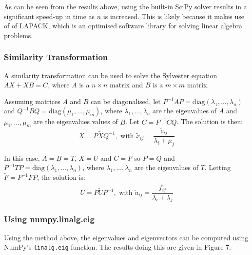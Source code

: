 \documentclass{article}
\numberwithin{equation}{section}
\begin{document}
As can be seen from the results above, using the built-in SciPy solver results in a significant speed-up in time as $n$ is increased. This is likely because it makes use of of LAPACK, which is an optimised software library for solving linear algebra problems.


\subsubsection{Similarity Transformation}
A similarity transformation \cite{Simoncini} can be used to solve the Sylvester equation $AX + XB = C$, where $A$ is a $n \times n$ matrix and $B$ is a $m \times m$ matrix. 

Assuming matrices $A$ and $B$ can be diagonalised, let $P^{-1}AP = \text{diag}(\lambda_1, \dots, \lambda_n)$ and $Q^{-1}BQ = \text{diag}(\mu_1, \dots, \mu_m)$, where $\lambda_1, \dots, \lambda_n$ are the eigenvalues of $A$ and $\mu_1, \dots, \mu_m$ are the eigenvalues values of $B$. Let $\tilde{C} = P^{-1}CQ$. The solution is then:
\[ X = P \tilde{X} Q^{-1}, \text{ with } \tilde{x}_{ij} = \frac{\tilde{c}_{ij}}{\lambda_i + \mu_j} \]

In this case, $A=B=T$, $X=U$ and $C=F$ so $P=Q$ and $P^{-1}TP = \text{diag}(\lambda_1, \dots, \lambda_n)$, where $\lambda_1, \dots, \lambda_n$ are the eigenvalues of $T$. Letting $\tilde{F}=P^{-1}FP$, the solution is:
\[ U = P \tilde{U} P^{-1}, \text{ with } \tilde{u}_{ij} = \frac{\tilde{f}_{ij}}{\lambda_i + \lambda_j} \]

\subsubsection*{Using numpy.linalg.eig}
Using the method above, the eigenvalues and eigenvectors can be computed using NumPy's \texttt{linalg.eig} function. The results doing this are given in Figure 7.
\end{document}
